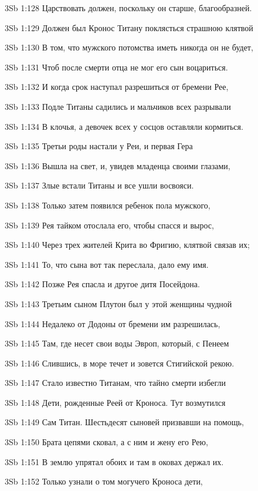 \vs 3Sb 1:128 Царствовать должен, поскольку он старше, благообразней. 

\vs 3Sb 1:129 Должен был Кронос Титану поклясться страшною клятвой

\vs 3Sb 1:130 В том, что мужского потомства иметь никогда он не будет, 

\vs 3Sb 1:131 Чтоб после смерти отца не мог его сын воцариться. 

\vs 3Sb 1:132 И когда срок наступал разрешиться от бремени Рее, 

\vs 3Sb 1:133 Подле Титаны садились и мальчиков всех разрывали 

\vs 3Sb 1:134 В клочья, а девочек всех у сосцов оставляли кормиться.

\vs 3Sb 1:135 Третьи роды настали у Реи, и первая Гера

\vs 3Sb 1:136 Вышла на свет, и, увидев младенца своими глазами, 

\vs 3Sb 1:137 Злые встали Титаны и все ушли восвояси. 

\vs 3Sb 1:138 Только затем появился ребенок пола мужского, 

\vs 3Sb 1:139 Рея тайком отослала его, чтобы спасся и вырос,

\vs 3Sb 1:140 Через трех жителей Крита во Фригию, клятвой связав их; 

\vs 3Sb 1:141 То, что сына вот так переслала, дало ему имя.

\vs 3Sb 1:142 Позже Рея спасла и другое дитя  Посейдона. 

\vs 3Sb 1:143 Третьим сыном Плутон был у этой женщины чудной  

\vs 3Sb 1:144 Недалеко от Додоны от бремени им разрешилась,

\vs 3Sb 1:145 Там, где несет свои воды Эвроп, который, с Пенеем 

\vs 3Sb 1:146 Слившись, в море течет и зовется Стигийской рекою. 

\vs 3Sb 1:147 Стало известно Титанам, что тайно смерти избегли 

\vs 3Sb 1:148 Дети, рожденные Реей от Кроноса. Тут возмутился 

\vs 3Sb 1:149 Сам Титан. Шестьдесят сыновей призвавши на помощь,

\vs 3Sb 1:150 Брата цепями сковал, а с ним и жену его Рею, 

\vs 3Sb 1:151 В землю упрятал обоих и там в оковах держал их. 

\vs 3Sb 1:152 Только узнали о том могучего Кроноса дети, 

